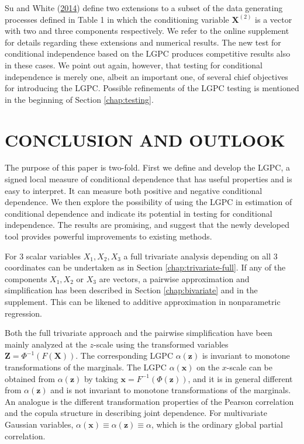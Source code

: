 \documentclass[
  12pt,
  letterpaper]{article}
\newcommand{\X}{\bm{X}}
\newcommand{\Xtwo}{\bm{X}^{(2)}}
\newcommand{\x}{\bm{x}}
\newcommand{\Z}{\bm{Z}}
\newcommand{\z}{\bm{z}}
\theoremstyle{definition}
\theoremstyle{definition}
\theoremstyle{definition}
\theoremstyle{remark}
\begin{document}
Su and White (\protect\hyperlink{ref-su2014testing}{2014}) define two extensions to a subset of the data generating processes defined in Table 1 in which the conditioning variable \(\Xtwo\) is a vector with two and three components respectively. We refer to the online supplement for details regarding these extensions and numerical results. The new test for conditional independence based on the LGPC produces competitive results also in these cases. We point out again, however, that testing for conditional independence is merely one, albeit an important one, of several chief objectives for introducing the LGPC. Possible refinements of the LGPC testing is mentioned in the beginning of Section \ref{chap:testing}.

\hypertarget{conclusion-and-outlook}{%
\section{CONCLUSION AND OUTLOOK}\label{conclusion-and-outlook}}

The purpose of this paper is two-fold. First we define and develop the LGPC, a signed local measure of conditional dependence that has useful properties and is easy to interpret. It can measure both positive and negative conditional dependence. We then explore the possibility of using the LGPC in estimation of conditional dependence and indicate its potential in testing for conditional independence. The results are promising, and suggest that the newly developed tool provides powerful improvements to existing methods.

For 3 scalar variables \(X_1, X_2, X_3\) a full trivariate analysis depending on all 3 coordinates can be undertaken as in Section \ref{chap:trivariate-full}. If any of the components \(X_1, X_2\) or \(X_3\) are vectors, a pairwise approximation and simplification has been described in Section \ref{chap:bivariate} and in the supplement. This can be likened to additive approximation in nonparametric regression.

Both the full trivariate approach and the pairwise simplification have been mainly analyzed at the \(z\)-scale using the transformed variables \(\Z = \Phi^{-1}(F(\X))\). The corresponding LGPC \(\alpha(\z)\) is invariant to monotone transformations of the marginals. The LGPC \(\alpha(\x)\) on the \(x\)-scale can be obtained from \(\alpha(\z)\) by taking \(\x = F^{-1}(\Phi(\z))\), and it is in general different from \(\alpha(\z)\) and is not invariant to monotone transformations of the marginals. An analogue is the different transformation properties of the Pearson correlation and the copula structure in describing joint dependence. For multivariate Gaussian variables, \(\alpha(\x) \equiv \alpha(\z) \equiv \alpha\), which is the ordinary global partial correlation.
\end{document}
